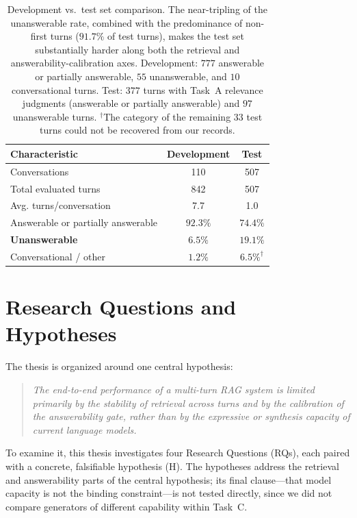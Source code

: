 \begin{table}[h]
\centering
\small
\begin{tabular}{lcc}
\toprule
\textbf{Characteristic} & \textbf{Development} & \textbf{Test} \\
\midrule
Conversations & 110 & 507 \\
Total evaluated turns & 842 & 507 \\
Avg. turns/conversation & 7.7 & 1.0 \\
Answerable or partially answerable & $92.3\%$ & $74.4\%$ \\
\textbf{Unanswerable} & $6.5\%$ & $\mathbf{19.1\%}$ \\
Conversational / other & $1.2\%$ & $6.5\%^{\dagger}$ \\
\bottomrule
\end{tabular}
\caption{Development vs.\ test set comparison. The near-tripling of the unanswerable rate, combined with the predominance of non-first turns ($91.7\%$ of test turns), makes the test set substantially harder along both the retrieval and answerability-calibration axes. Development: $777$ answerable or partially answerable, $55$ unanswerable, and $10$ conversational turns. Test: $377$ turns with Task~A relevance judgments (answerable or partially answerable) and $97$ unanswerable turns. $^{\dagger}$The category of the remaining $33$ test turns could not be recovered from our records.}
\label{tab:dev-test-en}
\end{table}

\section{Research Questions and Hypotheses}
\label{sec:rq}

The thesis is organized around one central hypothesis:

\begin{quote}
\textit{The end-to-end performance of a multi-turn RAG system is limited primarily by the stability of retrieval across turns and by the calibration of the answerability gate, rather than by the expressive or synthesis capacity of current language models.}
\end{quote}

To examine it, this thesis investigates four Research Questions (RQs), each paired with a concrete, falsifiable hypothesis (H). The hypotheses address the retrieval and answerability parts of the central hypothesis; its final clause---that model capacity is not the binding constraint---is not tested directly, since we did not compare generators of different capability within Task~C.

